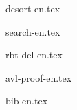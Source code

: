 \documentclass[b5paper,twoside]{book}
\begin{document}
{dcsort-en.tex}

{search-en.tex}

\backmatter

\appendix
\noappendicestocpagenum
\addappheadtotoc

\renewcommand{\thechapter}{\Alph{chapter}}
\renewcommand{\thesection}{\Roman{section}}
\renewcommand{\thesubsection}{\fnsymbol{subsection}}

{rbt-del-en.tex}

{avl-proof-en.tex}


{bib-en.tex}



\printindex
\end{document}
